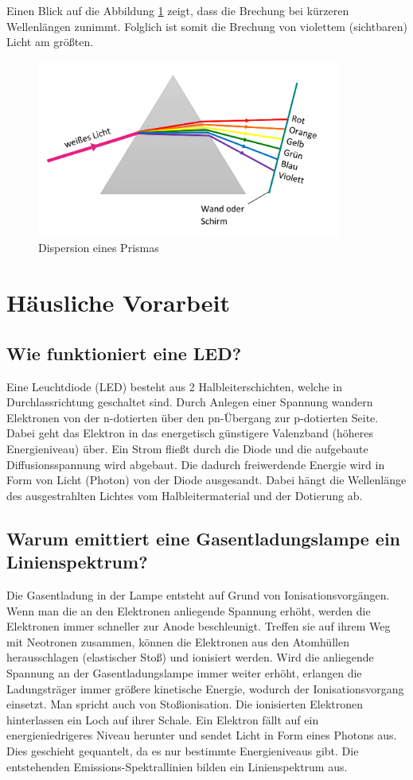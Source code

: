 \documentclass[a4paper]{scrartcl}
\numberwithin{equation}{subsection}
\begin{document}
Einen Blick auf die Abbildung \ref{fig:DispersionPrisma} zeigt, dass die Brechung bei kürzeren Wellenlängen zunimmt.
Folglich ist somit die Brechung von violettem (sichtbaren) Licht am größten.

\begin{figure}[H]
	\includegraphics[width=10cm]{Abbildungen/DispersionPrisma}
	\centering
	\caption{Dispersion eines Prismas \cite{anl}}
	\centering
	\label{fig:DispersionPrisma}
\end{figure}

\newpage
\section{Häusliche Vorarbeit}
\subsection{Wie funktioniert eine LED?}
Eine Leuchtdiode (LED) besteht aus 2 Halbleiterschichten, welche in Durchlassrichtung geschaltet sind.
Durch Anlegen einer Spannung wandern Elektronen von der n-dotierten über den pn-Übergang zur p-dotierten Seite.
Dabei geht das Elektron in das energetisch günstigere Valenzband (höheres Energieniveau) über.
Ein Strom fließt durch die Diode und die aufgebaute Diffusionsspannung wird abgebaut.
Die dadurch freiwerdende Energie wird in Form von Licht (Photon) von der Diode ausgesandt.
Dabei hängt die Wellenlänge des ausgestrahlten Lichtes vom Halbleitermaterial und der Dotierung ab. \cite{leifiled}

\subsection{Warum emittiert eine Gasentladungslampe ein Linienspektrum?}
Die Gasentladung in der Lampe entsteht auf Grund von Ionisationsvorgängen.
Wenn man die an den Elektronen anliegende Spannung erhöht, werden die Elektronen immer schneller zur Anode beschleunigt.
Treffen sie auf ihrem Weg mit Neotronen zusammen, können die Elektronen aus den Atomhüllen herausschlagen (elastischer Stoß) und ionisiert werden.
Wird die anliegende Spannung an der Gasentladungslampe immer weiter erhöht, erlangen die Ladungsträger immer größere kinetische Energie, wodurch der Ionisationsvorgang einsetzt.
Man spricht auch von Stoßionisation.
Die ionisierten Elektronen hinterlassen ein Loch auf ihrer Schale.
Ein Elektron fällt auf ein energieniedrigeres Niveau herunter und sendet Licht in Form eines Photons aus.
Dies geschieht gequantelt, da es nur bestimmte Energieniveaus gibt.
Die entstehenden Emissions-Spektrallinien bilden ein Linienspektrum aus. \cite{lernhelfer}
\end{document}
